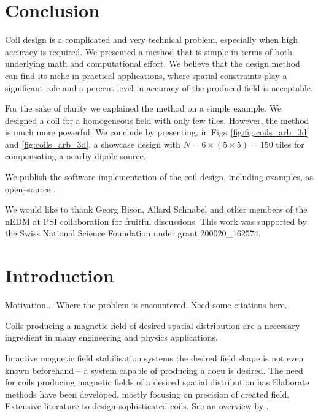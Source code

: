 \section{Conclusion}
Coil design is a complicated and very technical problem, especially when high accuracy is required. We presented a method that is simple in terms of both underlying math and computational effort. We believe that the design method can find its niche in practical applications, where spatial constraints play a significant role and a percent level in accuracy of the produced field is acceptable.

For the sake of clarity we explained the method on a simple example. We designed a coil for a homogeneous field with only few tiles. However, the method is much more powerful. We conclude by presenting, in Figs.\,\ref{fig:fig:coils_arb_3d} and \ref{fig:coils_arb_3d}, a showcase design with $N = 6 \times (5 \times 5) = 150$ tiles for compensating a nearby dipole source. 

We publish the software implementation of the coil design, including examples, as open--source \cite{Coilsjlcode}.

We would like to thank Georg Bison, Allard Schnabel and other members of the nEDM at PSI collaboration for fruitful discussions. This work was supported by the Swiss National Science Foundation under grant 200020\_162574.
  











\section{Introduction}

Motivation... Where the problem is encountered. Need some citations here.

Coils producing a magnetic field of desired spatial distribution are a necessary ingredient in many engineering and physics applications.

In active magnetic field stabilisation systems the desired field shape is not even known beforehand -- a system capable of producing a aoeu is desired.
The need for coils producing magnetic fields of a desired spatial distribution has
Elaborate methods have been developed, mostly focusing on precision of created field.
Extensive literature to design sophisticated coils.
See an overview by \citeauthor{Turner1993} \citep{Turner1993}.

